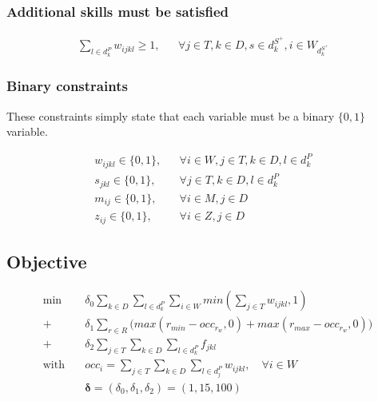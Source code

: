 \documentclass[../../thesis.tex]{subfiles}
\begin{document}
\subsubsection{Additional skills must be satisfied}

\begin{align}
  \sum_{l \in d_k^P} w_{ijkl} \geq 1, && \forall j \in T, k \in D, s \in d^{S^+}_k, i \in W_{d^{S^+}_k}& \label{wc8}
\end{align}

\subsubsection{Binary constraints}

These constraints simply state that each variable must be a binary $\{ 0, 1 \}$ variable.

\begin{align}
  w_{ijkl} \in \{0, 1\}, && \forall i \in W, j \in T, k \in D, l \in d^P_k &\label{binary1} \\
  s_{jkl} \in \{0, 1\}, && \forall j \in T, k \in D, l \in d^P_k& \label{binary2} \\
  m_{ij} \in \{0, 1\}, && \forall i \in M, j \in D& \label{binary3} \\ 
  z_{ij} \in \{0, 1\}, && \forall i \in Z, j \in D& \label{binary4} 
\end{align}

\subsection{Objective}


\begingroup
\allowdisplaybreaks
\begin{subequations}
  \label{obj}
  \begin{align}
    \textrm{min} \quad & \delta_0 \sum_{k \in D} \sum_{l \in d^P_k} \sum_{i \in W} min(\sum_{j \in T} w_{ijkl}, 1) \label{obj:1} \\ 
      + \ & \delta_1 \sum_{r \in R} \big( max(r_{min} - occ_{r_{w}}, 0) + max(r_{max} - occ_{r_{w}}, 0) \big)  \label{obj:3} \\ 
      + \ &\delta_2 \sum_{j \in T}\sum_{k\in D}\sum_{l \in d^P_k} f_{jkl} \label{obj:2} \\ 
     \textrm{with} \quad & occ_i = \sum_{j \in T} \sum_{k \in D} \sum_{l \in d^P_j} w_{ijkl}, \quad \forall i \in W  \nonumber \\ 
                         & \bm{\delta} = (\delta_0, \delta_1, \delta_2) = (1, 15, 100) \nonumber
  \end{align}
\end{subequations}
\endgroup
\end{document}
